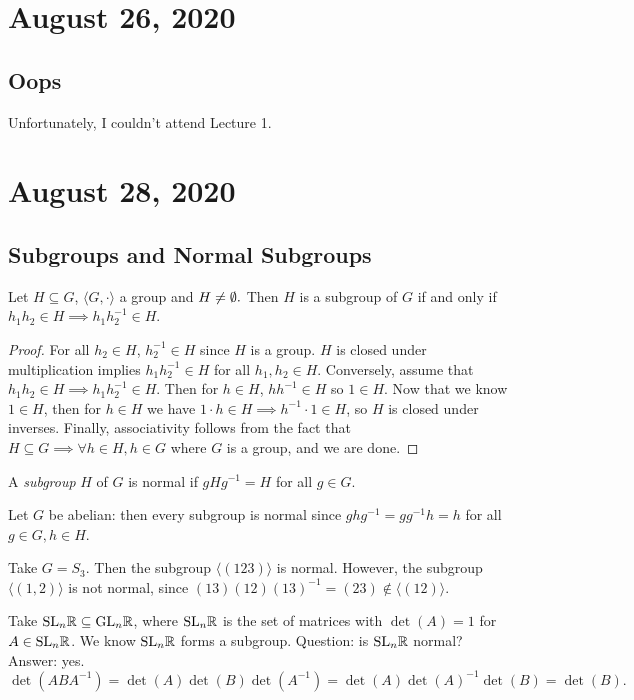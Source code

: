 \section{August 26, 2020}
\subsection{Oops}
Unfortunately, I couldn't attend Lecture 1.
\section{August 28, 2020}

\subsection{Subgroups and Normal Subgroups}
\begin{lemma} Let $H \subseteq G$, $\langle G, \cdot \rangle$ a group and $H \neq \emptyset.$ Then $H$ is a subgroup of $G$ if and only if $h_1h_2 \in H \implies h_1h_2^{-1}\in H$.
\end{lemma}
\begin{proof}
    For all $h_2 \in H$, $h_2^{-1} \in H$ since $H$ is a group. $H$ is closed under multiplication implies $h_1h_2^{-1}\in H$ for all $h_1,h_2 \in H$. Conversely, assume that $h_1h_2\in H\implies h_1h_2^{-1}\in H.$ Then for $h\in H$, $hh^{-1}\in H$ so $1\in H$. Now that we know $1\in H$, then for $h\in H$ we have $1\cdot h \in H \implies h^{-1}\cdot 1\in H$, so $H$ is closed under inverses. Finally, associativity follows from the fact that  $H \subseteq G \implies \forall h \in H, h \in G$ where $G$ is a group, and we are done.
\end{proof}

\begin{definition}
    A \emph{subgroup} $H$ of $G$ is normal if $gHg^{-1}=H$ for all $g \in G$.
\end{definition}
\begin{example}
    Let $G$ be abelian: then every subgroup is normal since $ghg^{-1}=gg^{-1}h=h$ for all $g \in G, h \in H$.
\end{example}
\begin{example}
    Take $G=S_3.$ Then the subgroup $\langle (123) \rangle$ is normal. However, the subgroup $\langle (1,2) \rangle$ is not normal, since $(13)(12)(13)^{-1}=(23) \notin \langle(12)\rangle$.
\end{example}
\begin{example}
    Take $\textrm{SL}_n\mathbb{R} \subseteq \textrm{GL}_n\mathbb{R}$, where $\textrm{SL}_n\mathbb{R}$ is the set of matrices with $\det(A)=1$ for $A \in \textrm{SL}_n\mathbb{R}$. We know $\textrm{SL}_n\mathbb{R}$ forms a subgroup. Question: is $\textrm{SL}_n\mathbb{R}$ normal? Answer: yes.
    \[
        \det(ABA^{-1})=\det(A)\det(B)\det(A^{-1})=\det(A)\det(A)^{-1}\det(B)=\det(B).
    \]
\end{example}

